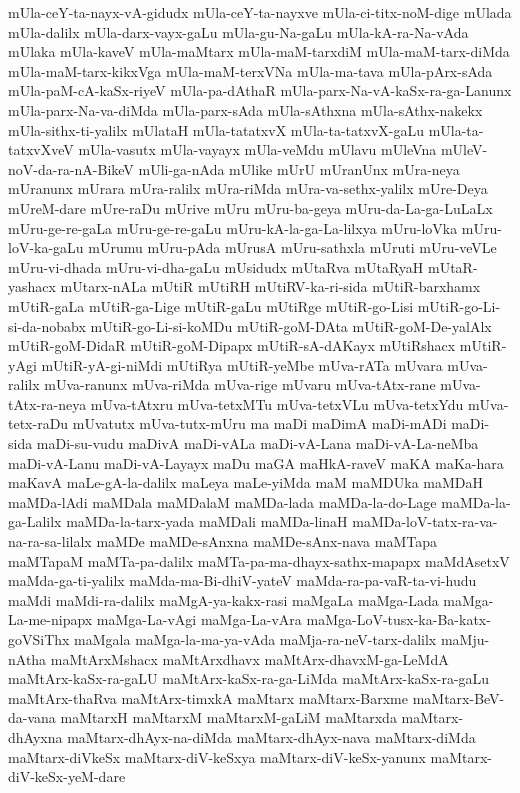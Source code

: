 {mUla-ceY-ta-nayx-vA-gidudx
mUla-ceY-ta-nayxve
mUla-ci-titx-noM-dige
mUlada
mUla-dalilx
mUla-darx-vayx-gaLu
mUla-gu-Na-gaLu
mUla-kA-ra-Na-vAda
mUlaka
mUla-kaveV
mUla-maMtarx
mUla-maM-tarxdiM
mUla-maM-tarx-diMda
mUla-maM-tarx-kikxVga
mUla-maM-terxVNa
mUla-ma-tava
mUla-pArx-sAda
mUla-paM-cA-kaSx-riyeV
mUla-pa-dAthaR
mUla-parx-Na-vA-kaSx-ra-ga-Lanunx
mUla-parx-Na-va-diMda
mUla-parx-sAda
mUla-sAthxna
mUla-sAthx-nakekx
mUla-sithx-ti-yalilx
mUlataH
mUla-tatatxvX
mUla-ta-tatxvX-gaLu
mUla-ta-tatxvXveV
mUla-vasutx
mUla-vayayx
mUla-veMdu
mUlavu
mUleVna
mUleV-noV-da-ra-nA-BikeV
mUli-ga-nAda
mUlike
mUrU
mUranUnx
mUra-neya
mUranunx
mUrara
mUra-ralilx
mUra-riMda
mUra-va-sethx-yalilx
mUre-Deya
mUreM-dare
mUre-raDu
mUrive
mUru
mUru-ba-geya
mUru-da-La-ga-LuLaLx
mUru-ge-re-gaLa
mUru-ge-re-gaLu
mUru-kA-la-ga-La-lilxya
mUru-loVka
mUru-loV-ka-gaLu
mUrumu
mUru-pAda
mUrusA
mUru-sathxla
mUruti
mUru-veVLe
mUru-vi-dhada
mUru-vi-dha-gaLu
mUsidudx
mUtaRva
mUtaRyaH
mUtaR-yashacx
mUtarx-nALa
mUtiR
mUtiRH
mUtiRV-ka-ri-sida
mUtiR-barxhamx
mUtiR-gaLa
mUtiR-ga-Lige
mUtiR-gaLu
mUtiRge
mUtiR-go-Lisi
mUtiR-go-Li-si-da-nobabx
mUtiR-go-Li-si-koMDu
mUtiR-goM-DAta
mUtiR-goM-De-yalAlx
mUtiR-goM-DidaR
mUtiR-goM-Dipapx
mUtiR-sA-dAKayx
mUtiRshacx
mUtiR-yAgi
mUtiR-yA-gi-niMdi
mUtiRya
mUtiR-yeMbe
mUva-rATa
mUvara
mUva-ralilx
mUva-ranunx
mUva-riMda
mUva-rige
mUvaru
mUva-tAtx-rane
mUva-tAtx-ra-neya
mUva-tAtxru
mUva-tetxMTu
mUva-tetxVLu
mUva-tetxYdu
mUva-tetx-raDu
mUvatutx
mUva-tutx-mUru
ma
maDi
maDimA
maDi-mADi
maDi-sida
maDi-su-vudu
maDivA
maDi-vALa
maDi-vA-Lana
maDi-vA-La-neMba
maDi-vA-Lanu
maDi-vA-Layayx
maDu
maGA
maHkA-raveV
maKA
maKa-hara
maKavA
maLe-gA-la-dalilx
maLeya
maLe-yiMda
maM
maMDUka
maMDaH
maMDa-lAdi
maMDala
maMDalaM
maMDa-lada
maMDa-la-do-Lage
maMDa-la-ga-Lalilx
maMDa-la-tarx-yada
maMDali
maMDa-linaH
maMDa-loV-tatx-ra-va-na-ra-sa-lilalx
maMDe
maMDe-sAnxna
maMDe-sAnx-nava
maMTapa
maMTapaM
maMTa-pa-dalilx
maMTa-pa-ma-dhayx-sathx-mapapx
maMdAsetxV
maMda-ga-ti-yalilx
maMda-ma-Bi-dhiV-yateV
maMda-ra-pa-vaR-ta-vi-hudu
maMdi
maMdi-ra-dalilx
maMgA-ya-kakx-rasi
maMgaLa
maMga-Lada
maMga-La-me-nipapx
maMga-La-vAgi
maMga-La-vAra
maMga-LoV-tusx-ka-Ba-katx-goVSiThx
maMgala
maMga-la-ma-ya-vAda
maMja-ra-neV-tarx-dalilx
maMju-nAtha
maMtArxMshacx
maMtArxdhavx
maMtArx-dhavxM-ga-LeMdA
maMtArx-kaSx-ra-gaLU
maMtArx-kaSx-ra-ga-LiMda
maMtArx-kaSx-ra-gaLu
maMtArx-thaRva
maMtArx-timxkA
maMtarx
maMtarx-Barxme
maMtarx-BeV-da-vana
maMtarxH
maMtarxM
maMtarxM-gaLiM
maMtarxda
maMtarx-dhAyxna
maMtarx-dhAyx-na-diMda
maMtarx-dhAyx-nava
maMtarx-diMda
maMtarx-diVkeSx
maMtarx-diV-keSxya
maMtarx-diV-keSx-yanunx
maMtarx-diV-keSx-yeM-dare
}
